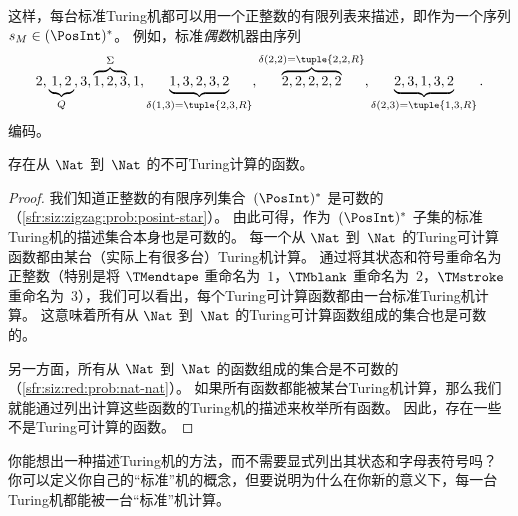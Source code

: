 \documentclass[../../../include/open-logic-section]{subfiles}
\begin{document}
\begin{explain}
这样，每台标准Turing机都可以用一个正整数的有限列表来描述，即作为一个序列 $s_M \in
(\PosInt)^*$。
例如，标准\emph{偶数}机器由序列
\[
2, \underbrace{1, 2}_Q, 3, \overbrace{1, 2, 3}^\Sigma, 1, \underbrace{1, 3, 2, 3, 2}_{\delta(1,3) = \tuple{2,3,R}},
\overbrace{2, 2, 2, 2, 2}^{\delta(2,2) = \tuple{2,2,R}},
\underbrace{2, 3, 1, 3, 2}_{\delta(2,3) = \tuple{1,3,R}}.
\]
编码。
\end{explain}

\begin{thm}
存在从 $\Nat$ 到~$\Nat$ 的不可Turing计算的函数。
\end{thm}

\begin{proof}
我们知道正整数的有限序列集合~$(\PosInt)^*$ 是可数的（\cref{sfr:siz:zigzag:prob:posint-star}）。
由此可得，作为~$(\PosInt)^*$ 子集的标准Turing机的描述集合本身也是可数的。
每一个从 $\Nat$ 到~$\Nat$ 的Turing可计算函数都由某台（实际上有很多台）Turing机计算。
通过将其状态和符号重命名为正整数（特别是将 $\TMendtape$ 重命名为~$1$，$\TMblank$ 重命名为~$2$，$\TMstroke$ 重命名为~$3$），我们可以看出，每个Turing可计算函数都由一台标准Turing机计算。
这意味着所有从 $\Nat$ 到~$\Nat$ 的Turing可计算函数组成的集合也是可数的。

另一方面，所有从 $\Nat$ 到~$\Nat$ 的函数组成的集合是不可数的（\cref{sfr:siz:red:prob:nat-nat}）。
如果所有函数都能被某台Turing机计算，那么我们就能通过列出计算这些函数的Turing机的描述来枚举所有函数。
因此，存在一些不是Turing可计算的函数。
\end{proof}

\begin{prob}
  你能想出一种描述Turing机的方法，而不需要显式列出其状态和字母表符号吗？
  你可以定义你自己的“标准”机的概念，但要说明为什么在你新的意义下，每一台Turing机都能被一台“标准”机计算。
\end{prob}
\end{document}
